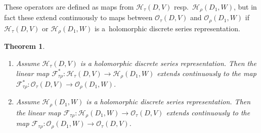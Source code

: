 \documentclass[pdftex]{sigma}
\numberwithin{equation}{section}
\newtheorem{Theorem}{Theorem}[section]
\newcommand{\cF}{\mathcal{F}}
\newcommand{\cH}{\mathcal{H}}
\newcommand{\cO}{\mathcal{O}}
\begin{document}
These operators are defined as maps from $\cH_\tau(D,V)$ resp.~$\cH_\rho(D_1,W)$, but in fact these extend continuously to maps between
$\cO_\tau(D,V)$ and $\cO_\rho(D_1,W)$ if $\cH_\tau(D,V)$ or $\cH_\rho(D_1,W)$ is a~holomorphic discrete series representation.
\begin{Theorem}\label{conti_ext}\quad
\begin{enumerate}\itemsep=0pt
\item[$(1)$] Assume $\cH_\tau(D,V)$ is a holomorphic discrete series representation. Then
the linear map $\cF_{\tau\rho}^*\colon\! \cH_\tau(D,V)\!\to\!\cH_\rho(D_1{,}W)$ extends continuously to the map $\cF_{\tau\rho}^*\colon\! \cO_\tau(D,V)\!\to\!\cO_\rho(D_1{,}W)$.
\item[$(2)$] Assume $\cH_\rho(D_1,W)$ is a holomorphic discrete series representation. Then
the linear map $\cF_{\tau\rho}\colon\! \cH_\rho(D_1,W)\!\to\! \cO_\tau(D{,}V)$ extends continuously to the map $\cF_{\tau\rho}\colon\! \cO_\rho(D_1,W)\!\to \! \cO_\tau(D{,}V)$.
\end{enumerate}
\end{Theorem}
\end{document}
